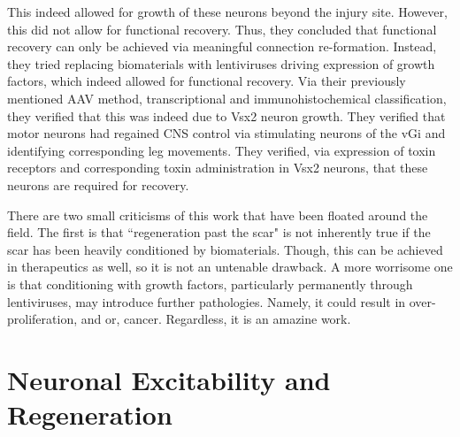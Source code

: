 This indeed allowed for growth of these neurons beyond the injury site. However, this did not allow for functional recovery. Thus, they concluded that functional recovery can only be achieved via meaningful connection re-formation. Instead, they tried replacing biomaterials with lentiviruses driving expression of growth factors, which indeed allowed for functional recovery. Via their previously mentioned AAV method, transcriptional and immunohistochemical classification, they verified that this was indeed due to Vsx2 neuron growth. They verified that motor neurons had regained CNS control via stimulating neurons of the vGi and identifying corresponding leg movements. They verified, via expression of toxin receptors and corresponding toxin administration in Vsx2 neurons, that these neurons are required for recovery.\newline

There are two small criticisms of this work that have been floated around the field. The first is that ``regeneration past the scar" is not inherently true if the scar has been heavily conditioned by biomaterials. Though, this can be achieved in therapeutics as well, so it is not an untenable drawback. A more worrisome one is that conditioning with growth factors, particularly permanently through lentiviruses, may introduce further pathologies. Namely, it could result in over-proliferation, and or, cancer. Regardless, it is an amazine work. 

\section{Neuronal Excitability and Regeneration}

